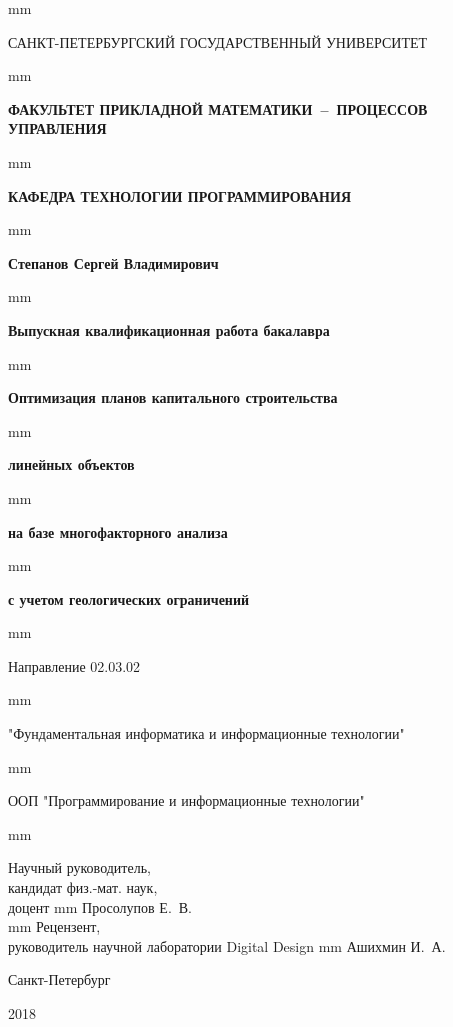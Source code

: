 \thispagestyle{empty}  mm
\centerline{{САНКТ-ПЕТЕРБУРГСКИЙ ГОСУДАРСТВЕННЫЙ
УНИВЕРСИТЕТ}}  mm
\centerline{\bf{ФАКУЛЬТЕТ ПРИКЛАДНОЙ МАТЕМАТИКИ~--~ПРОЦЕССОВ УПРАВЛЕНИЯ}}  mm
\centerline{\bf{КАФЕДРА ТЕХНОЛОГИИ ПРОГРАММИРОВАНИЯ}}
 mm \centerline{\LARGE\bf{Степанов Сергей Владимирович}}
 mm \centerline{\LARGE\bf{Выпускная квалификационная работа бакалавра}}  mm
\centerline{\LARGE\bf{Оптимизация планов капитального строительства}}  mm
\centerline{\LARGE\bf{линейных объектов}}  mm
\centerline{\LARGE\bf{на базе многофакторного анализа}}  mm
\centerline{\LARGE\bf{с учетом геологических ограничений}}  mm
\centerline{\large Направление 02.03.02}  mm
\centerline{\large "Фундаментальная информатика и информационные технологии"}  mm
\centerline{\large ООП "Программирование и информационные технологии"}  mm
\large{
\noindent
Научный руководитель,\\
кандидат физ.-мат. наук,\\
доцент  mm Просолупов Е.~В.\\
 mm \noindent
Рецензент,\\
руководитель научной лаборатории Digital Design  mm Ашихмин И.~А.\\
\vfill \hfil\break
\centerline{\large Санкт-Петербург } \centerline{ 2018 }}
\newpage
